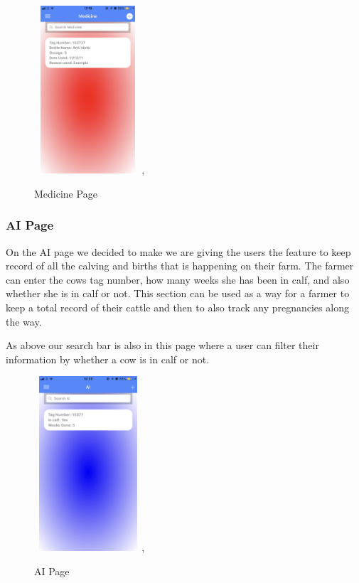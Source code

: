 \documentclass[12pt,a4paper,oneside,openany]{book}
\begin{document}
\begin{figure}[ht]
\renewcommand\thefigure{5.14}
\centering
\includegraphics[width=4cm,height=6.25cm]{Images/medicine.png},
\caption{Medicine Page}
\label{medicine}
\end{figure}

\newpage

\subsubsection{AI Page}
On the AI page we decided to make we are giving the users the feature to keep record of all the calving and births that is happening on their farm. The farmer can enter the cows tag number, how many weeks she has been in calf, and also whether she is in calf or not. This section can be used as a way for a farmer to keep a total record of their cattle and then to also track any pregnancies along the way.

As above our search bar is also in this page where a user can filter their information by whether a cow is in calf or not.

\begin{figure}[ht]
\renewcommand\thefigure{5.15}
\centering
\includegraphics[width=4cm,height=6.5cm]{Images/AI.png},
\caption{AI Page}
\label{AI}
\end{figure}
\end{document}
